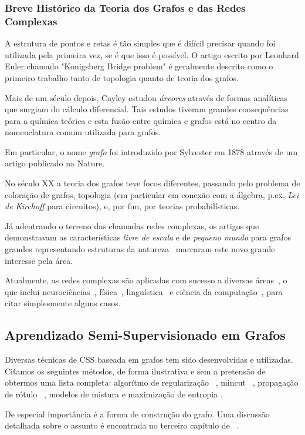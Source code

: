 \documentclass[12pt]{article}
\begin{document}
\subsubsection{Breve Histórico da Teoria dos Grafos e das Redes Complexas}
A estrutura de pontos e retas é tão simples que é difícil precisar quando foi utilizada pela primeira vez, se é que isso é possível. O artigo escrito por Leonhard Euler chamado "Konigsberg Bridge problem" é geralmente descrito como o primeiro trabalho tanto de topologia quanto de teoria dos grafos.

Mais de um século depois, Cayley estudou \emph{árvores} através de formas analíticas que surgiam do cálculo diferencial. Tais estudos tiveram grandes consequências para a química teórica e esta fusão entre química e grafos está no centro da nomenclatura comum utilizada para grafos.

Em particular, o nome \emph{grafo} foi introduzido por Sylvester em 1878 através de um artigo publicado na Nature.

No século XX a teoria dos grafos teve focos diferentes, passando pelo problema de coloração de grafos, topologia (em particular em conexão com a álgebra, p.ex. \emph{Lei de Kirchoff} para circuitos), e, por fim, por teorias probabilísticas.

Já adentrando o terreno das chamadas redes complexas, os artigos que demonstravam as características \emph{livre de escala} e de \emph{pequeno mundo} para grafos grandes representando estruturas da natureza~\cite{ferrer,barabasi} marcaram este novo grande interesse pela área.

Atualmente, as redes complexas são aplicadas com sucesso a diversas áreas~\cite{costaapp}, o que inclui neurociências~\cite{sporns}, física~\cite{pnas}, linguística~\cite{dorogo2} e ciência da computação~\cite{signature}, para citar simplesmente alguns casos.


\subsection{Aprendizado Semi-Supervisionado em Grafos}
Diversas técnicas de CSS baseada em grafos tem sido desenvolvidas e utilizadas. Citamos os seguintes métodos, de forma ilustrativa e sem a pretensão de obtermos uma lista completa: algorítmo de regularização ~\cite{reg}, mincut ~\cite{mincuts}, propagação de rótulo ~\cite{zhu3}, modelos de mistura e maximização de entropia \cite{zhu1}.

De especial importância é a forma de construção do grafo. Uma discussão detalhada sobre o assunto é encontrada no terceiro capítulo de ~\cite{zhu1}.
\end{document}
